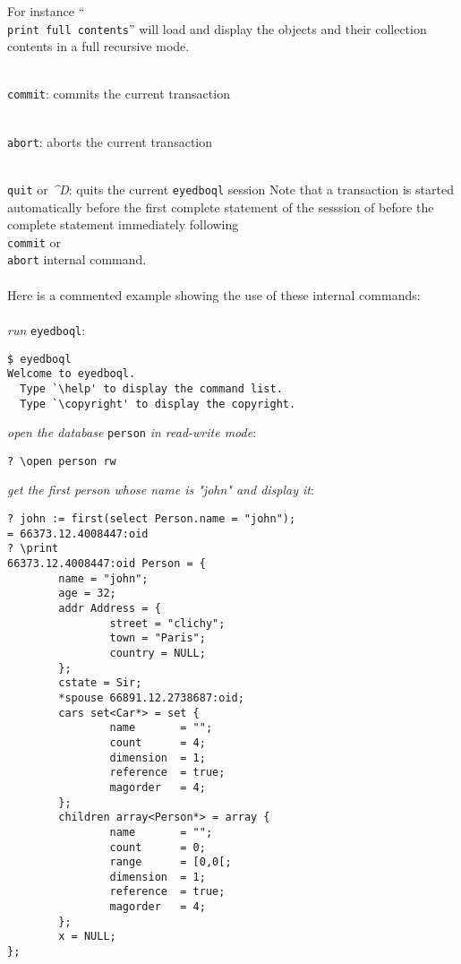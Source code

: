 For instance ``\texttt{\\print full contents}'' will load and display 
the objects and their collection contents in a full recursive mode.
\item \texttt{\\commit}: commits the current transaction
\item \texttt{\\abort}: aborts the current transaction
\item \texttt{\\quit} or \emph{\^{}D}: quits the current \texttt{eyedboql} session
\ee
Note that a transaction is started automatically before the first
complete statement of the sesssion of before the complete statement
immediately following \texttt{\\commit} or \texttt{\\abort} internal command.
\\
\\
Here is a commented example showing the use of these internal commands:\\
\\
\emph{run} \texttt{eyedboql}:
\begin{verbatim}
$ eyedboql
Welcome to eyedboql.
  Type `\help' to display the command list.
  Type `\copyright' to display the copyright.
\end{verbatim}
\emph{open the database} \texttt{person} \emph{in read-write mode}:
\begin{verbatim}
? \open person rw
\end{verbatim}
\emph{get the first person whose name is "john" and display it}:
\begin{verbatim}
? john := first(select Person.name = "john");
= 66373.12.4008447:oid
? \print
66373.12.4008447:oid Person = { 
        name = "john";
        age = 32;
        addr Address = { 
                street = "clichy";
                town = "Paris";
                country = NULL;
        };
        cstate = Sir;
        *spouse 66891.12.2738687:oid;
        cars set<Car*> = set { 
                name       = "";
                count      = 4;
                dimension  = 1;
                reference  = true;
                magorder   = 4;
        };
        children array<Person*> = array { 
                name       = "";
                count      = 0;
                range      = [0,0[;
                dimension  = 1;
                reference  = true;
                magorder   = 4;
        };
        x = NULL;
};
\end{verbatim}
